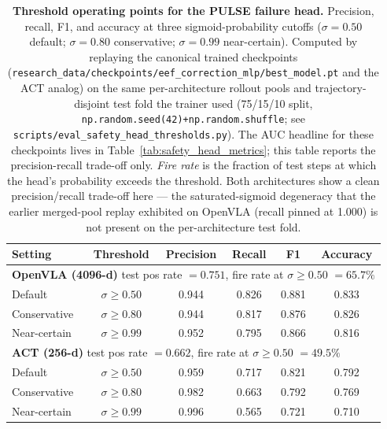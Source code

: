 \begin{table}[t]
\centering
\caption{\textbf{Threshold operating points for the PULSE failure head.} Precision, recall, F1, and accuracy at three sigmoid-probability cutoffs ($\sigma{=}0.50$ default; $\sigma{=}0.80$ conservative; $\sigma{=}0.99$ near-certain). Computed by replaying the canonical trained checkpoints (\texttt{research\_data/checkpoints/eef\_correction\_mlp/best\_model.pt} and the ACT analog) on the same per-architecture rollout pools and trajectory-disjoint test fold the trainer used (75/15/10 split, \texttt{np.random.seed(42)+np.random.shuffle}; see \texttt{scripts/eval\_safety\_head\_thresholds.py}). The AUC headline for these checkpoints lives in Table~\ref{tab:safety_head_metrics}; this table reports the precision-recall trade-off only. \textit{Fire rate} is the fraction of test steps at which the head's probability exceeds the threshold. Both architectures show a clean precision/recall trade-off here --- the saturated-sigmoid degeneracy that the earlier merged-pool replay exhibited on OpenVLA (recall pinned at 1.000) is not present on the per-architecture test fold.}
\label{tab:threshold_operating}
\begin{tabular}{lccccc}
\toprule
Setting & Threshold & Precision & Recall & F1 & Accuracy \\
\midrule
\multicolumn{6}{l}{\textbf{OpenVLA (4096-d)} \quad test pos rate $=0.751$, fire rate at $\sigma{\ge}0.50$ $=65.7\%$} \\
\midrule
Default          & $\sigma\ge0.50$ & 0.944 & 0.826 & 0.881 & 0.833 \\
Conservative     & $\sigma\ge0.80$ & 0.944 & 0.817 & 0.876 & 0.826 \\
Near-certain     & $\sigma\ge0.99$ & 0.952 & 0.795 & 0.866 & 0.816 \\
\midrule
\multicolumn{6}{l}{\textbf{ACT (256-d)} \quad test pos rate $=0.662$, fire rate at $\sigma{\ge}0.50$ $=49.5\%$} \\
\midrule
Default          & $\sigma\ge0.50$ & 0.959 & 0.717 & 0.821 & 0.792 \\
Conservative     & $\sigma\ge0.80$ & 0.982 & 0.663 & 0.792 & 0.769 \\
Near-certain     & $\sigma\ge0.99$ & 0.996 & 0.565 & 0.721 & 0.710 \\
\bottomrule
\end{tabular}
\end{table}
